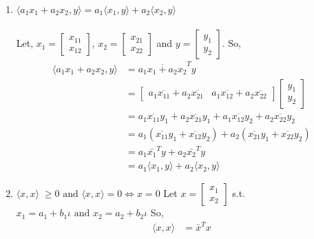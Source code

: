 \documentclass[a4paper]{article}
\begin{document}
\begin{qalist}
\begin{enumerate}[label=\alph*., align=left]
			\item $\langle {a}_{1}{x}_{1} + {a}_{2}{x}_{2},y \rangle = {a}_{1}\langle {x}_{1}, y \rangle + {a}_{2}\langle {x}_{2}, y \rangle$ \\ \\
				Let, ${x}_{1} = \begin{bmatrix}{x}_{11} \\ {x}_{12}\end{bmatrix}$, ${x}_{2} = \begin{bmatrix}{x}_{21} \\ {x}_{22}\end{bmatrix}$ and  $y = \begin{bmatrix}{y}_{1} \\ {y}_{2}\end{bmatrix}$. So, 
				\begin{align}
					\langle {a}_{1}{x}_{1} + {a}_{2}{x}_{2},y \rangle &= {\overline{{a}_{1}{x}_{1} + {a}_{2}{x}_{2}}}^{T}y \\
					&= \begin{bmatrix}{a}_{1}\overline{{x}_{11}} + {a}_{2}\overline{{x}_{21}} & {a}_{1}\overline{{x}_{12}} + {a}_{2}\overline{{x}_{22}}\end{bmatrix} \begin{bmatrix}{y}_{1} \\ {y}_{2}\end{bmatrix}\\
					&= {a}_{1}\overline{{x}_{11}}{y}_{1} + {a}_{2}\overline{{x}_{21}}{y}_{1} + {a}_{1}\overline{{x}_{12}}{y}_{2} + {a}_{2}\overline{{x}_{22}}{y}_{2} \\
					&= {a}_{1}(\overline{{x}_{11}}{y}_{1} + \overline{{x}_{12}}{y}_{2}) + {a}_{2}(\overline{{x}_{21}}{y}_{1} + \overline{{x}_{22}}{y}_{2}) \\
					&= {a}_{1}{\bar{{x}_{1}}}^{T}y + {a}_{2}{\bar{{x}_{2}}}^{T}y \\
					&= {a}_{1}\langle {x}_{1}, y \rangle + {a}_{2}\langle {x}_{2}, y \rangle
				\end{align}
			\item $\langle x,x \rangle \;\geq 0 \text{ and } \langle x,x \rangle = 0 \Leftrightarrow x = 0$
				Let $x = \begin{bmatrix}{x}_{1} \\ {x}_{2}\end{bmatrix}$ s.t. ${x}_{1} = {a}_{1} + {b}_{1}\iota \text{ and } {x}_{2} = {a}_{2} + {b}_{2}\iota$ So, 
				\begin{align}
					\langle x,x \rangle &= {\bar{x}}^{T}x \\

\end{align}
\end{enumerate}
\end{qalist}
\end{document}
